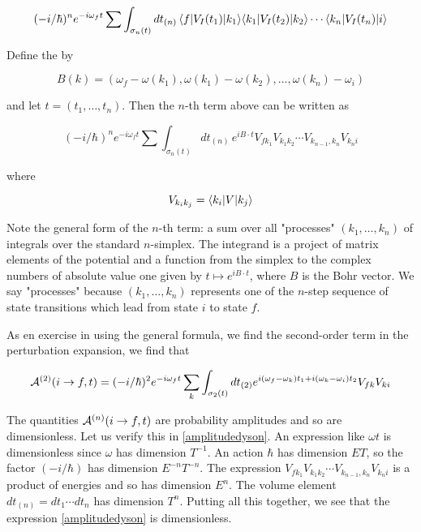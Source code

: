 \begin{equation}
 (-i/\hbar)^n e^{-i\omega_ft} \sum \int_{\sigma_n(t)} dt_{(n)}\,  
\langle f | V_I(t_1) | k_1 \rangle \langle k_1 | V_I(t_2) | k_2 \rangle\cdots  \langle k_n | V_I(t_n) | i \rangle 
\end{equation}

Define the  by

\begin{equation}
B(k) = (\omega_f - \omega(k_1), \omega(k_1) - \omega(k_2), \ldots , \omega(k_n) - \omega_i)
\end{equation}

and let $t = (t_1, \ldots, t_n)$. Then the $n$-th term above can be written as

\begin{equation}
\label{amplitudedyson}
 (-i/\hbar)^n e^{-i\omega_ft} \sum \int_{\sigma_n(t)} dt_{(n)}\, 
e^{iB\cdot t} V_{fk_1}V_{k_1k_2} \cdots V_{k_{n-1},k_n} V_{k_ni } 
\end{equation}

where

\begin{equation}
V_{k_ik_j} = \langle k_i | V | k_j \rangle
\end{equation}

Note the general form of the $n$-th term: a sum over all "processes" $(k_1, \ldots , k_n)$ of integrals over the standard $n$-simplex.  The integrand is a project of matrix elements of the potential and a function from the simplex to the complex numbers of absolute value one given by $t \mapsto e^{iB\cdot t}$, where $B$ is the Bohr vector.  We say "processes" because $(k_1, \ldots , k_n)$ represents one of the $n$-step sequence of state transitions which lead from state $i$ to state $f$.

As en exercise in using the general formula, we find the second-order term in the perturbation expansion, we find that

\begin{equation}
\mathcal{A}^{(2)}(i \to f, t) = (-i/\hbar)^2 e^{-i\omega_f t}\sum_k\int_{\sigma_2(t)} dt_{(2)}
e^{  i(\omega_f - \omega_k) t_1 + i( \omega_k - \omega_i )t_2  }  V_{fk}V_{ki}
\end{equation}

\begin{remark}
The quantities $\mathcal{A}^{(n)}(i \to f, t)$ are probability amplitudes and so are dimensionless.  Let us verify this in \eqref{amplitudedyson}.  An expression like $\omega t$ is dimensionless since $\omega$ has dimension $T^{-1}$.  An action $\hbar$ has dimension $ET$, so the factor $(-i/\hbar)$ has dimension $E^{-n}T^{-n}$.  The expression $ V_{fk_1}V_{k_1k_2} \cdots V_{k_{n-1},k_n} V_{k_ni } $ is a product of energies and so has dimension $E^n$.  The volume element $dt_{(n)} = dt_1\cdots dt_n$ has dimension $T^n$.  Putting all this together, we see that the expression \eqref{amplitudedyson} is dimensionless.
\end{remark}

